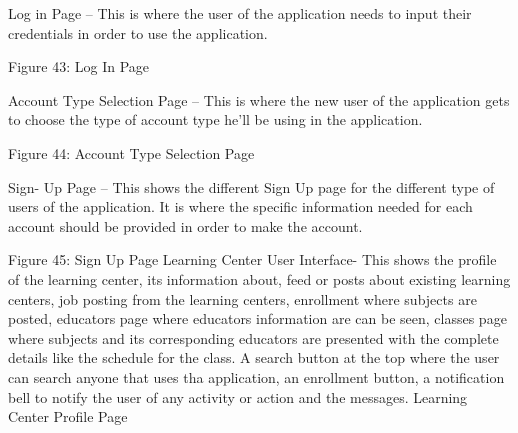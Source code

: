Log in Page – This is where the user of the application needs to input their credentials in order to use the application. 

 
 








Figure 43: Log In Page




Account Type Selection Page – This is where the new user of the application gets to choose the type of account type he’ll be using in the application.









Figure 44: Account Type Selection Page










Sign- Up Page – This shows the different Sign Up page for the different type of users of the application. It is where the specific information needed for each account should be provided in order to make the account.

     

       














Figure 45: Sign Up Page
Learning Center User Interface- This shows the profile of the learning center, its information about, feed or posts about existing learning centers, job posting from the learning centers, enrollment where subjects are posted, educators page where educators information are can be seen, classes page where subjects and its corresponding educators are presented with the complete details like the schedule for the class. A search button at the top where the user can search anyone that uses tha application, an enrollment button, a notification bell to notify the user of any activity or action and the messages.
Learning Center Profile Page

 














